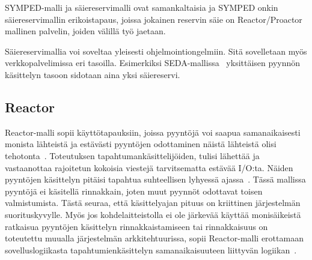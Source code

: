 \documentclass[finnish]{tktltiki2}
\theoremstyle{definition}
\theoremstyle{remark}
\begin{document}
SYMPED-malli ja säiereservimalli ovat samankaltaisia ja SYMPED onkin
säiereservimallin erikoistapaus, joissa jokainen reservin säie on
Reactor/Proactor mallinen palvelin,
joiden välillä työ jaetaan.

Säiereservimallia voi soveltaa yleisesti ohjelmointiongelmiin. Sitä
sovelletaan myös verkkopalvelimissa eri tasoilla. Esimerkiksi
SEDA-mallissa~\cite{welsh_seda_2001}
yksittäisen pyynnön käsittelyn tasoon sidotaan aina yksi säiereservi.

\subsection{Reactor}

Reactor-malli sopii käyttötapauksiin, joissa pyyntöjä voi saapua
samanaikaisesti monista lähteistä ja estävästi
pyyntöjen odottaminen näistä lähteistä olisi tehotonta~\cite{schmidt_reactor:_1995}.
Toteutuksen tapahtumankäsittelijöiden, tulisi
lähettää ja vastaanottaa rajoitetun kokoisia viestejä
tarvitsematta estävää I/O:ta.
Näiden pyyntöjen käsittelyn
pitäisi tapahtua suhteellisen lyhyessä ajassa~\cite{schmidt_reactor:_1995}.
Tässä mallissa pyyntöjä ei käsitellä rinnakkain, joten muut
pyynnöt odottavat toisen valmistumista.
Tästä seuraa, että käsittelyajan pituus on kriittinen järjestelmän
suorituskyvylle.
Myös jos kohdelaitteistolla ei ole järkevää käyttää monisäikeistä
ratkaisua pyyntöjen käsittelyn rinnakkaistamiseen tai rinnakkaisuus
on toteutettu muualla järjestelmän arkkitehtuurissa, sopii Reactor-malli
erottamaan sovelluslogiikasta tapahtumienkäsittelyn
samanaikaisuuteen liittyvän logiikan~\cite{schmidt_reactor:_1995}.
\end{document}
